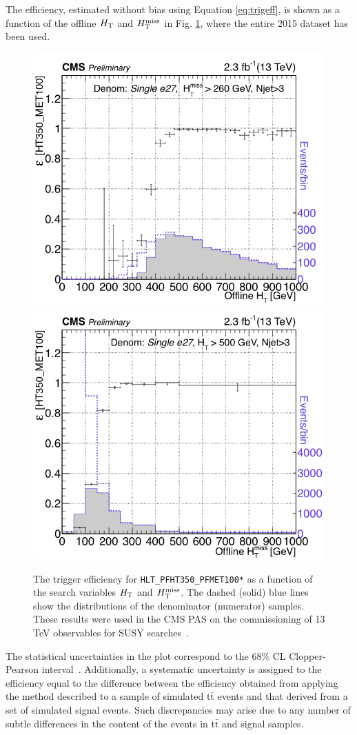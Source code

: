 The efficiency, estimated without bias using Equation \ref{eq:trigeff}, is shown as a function of the offline $H_{\rm T}$ and $H_{\text{T}}^{\rm miss}$ in Fig. \ref{fig:trigger-turnon}, where the entire 2015 dataset has been used. 
\begin{figure}[tb!]
  \begin{center}
    \includegraphics[width=0.49\linewidth]{figures/trigger/EffVsHt2_3InvFb.png}
    \includegraphics[width=0.49\linewidth]{figures/trigger/EffVsMht2_3InvFb.png}
    \caption{
      The trigger efficiency for \texttt{HLT\_PFHT350\_PFMET100*} 
      as a function of the search variables $H_{\rm T}$ and $H_{\text{T}}^{\rm miss}$. The dashed (solid) blue
      lines show the distributions of the denominator (numerator) samples. These results were used in the CMS PAS on the commissioning of 13 TeV observables for SUSY searches~\cite{CMS-DP-2015-035}.
      }
    \label{fig:trigger-turnon}
  \end{center}
\end{figure}
The statistical uncertainties in the plot correspond to the 68\% CL Clopper-Pearson
interval~\cite{Clopper:Pearson}. Additionally, a systematic uncertainty is assigned to the efficiency
equal to the difference between the efficiency obtained from applying the method described to a
sample of simulated t$\bar{\text{t}}$ events and that derived
from a set of simulated signal events. Such discrepancies may arise due to any number of subtle differences in the content of the events in t$\bar{\text{t}}$ and signal samples. 

